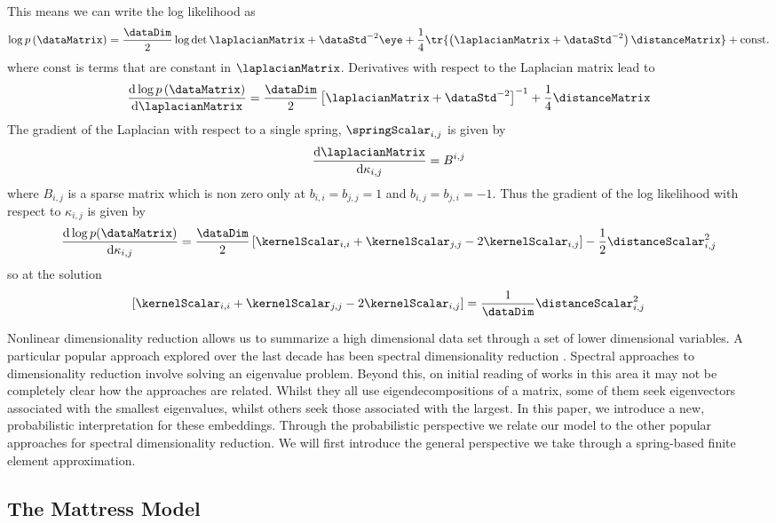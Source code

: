 This means we can write the log likelihood as 
\[
\log p\left(\dataMatrix\right) = \frac{\dataDim}{2}\log \det{\laplacianMatrix + \dataStd^{-2}\eye} + \frac{1}{4}\tr{\left(\laplacianMatrix + \dataStd^{-2}\right)\distanceMatrix} + \mathrm{const}.
\]
where $\mathrm{const}$ is terms that are constant in $\laplacianMatrix$.
Derivatives with respect to the Laplacian matrix lead to 
\[
\frac{\mathrm{d} \log p\left(\dataMatrix\right)}{\mathrm{d}\laplacianMatrix} = \frac{\dataDim}{2} \left[\laplacianMatrix + \dataStd^{-2}\right]^{-1} + \frac{1}{4}\distanceMatrix
\]
The gradient of the Laplacian with respect to a single spring, $\springScalar_{i,j}$ is given by 
\[
\frac{\mathrm{d}\laplacianMatrix}{\mathrm{d}\kappa_{i,j}}= B^{i,j}
\] 
where $B_{i,j}$ is a sparse matrix which is non zero only at $b_{i,i}=b_{j,j}=1$ and $b_{i,j}=b_{j,i}=-1$. Thus the gradient of the log likelihood with respect to $\kappa_{i,j}$ is given by
\[
\frac{\mathrm{d}\log p(\dataMatrix)}{\mathrm{d}\kappa_{i,j}} = \frac{\dataDim}{2}\left[\kernelScalar_{i,i} + \kernelScalar_{j, j} - 2 \kernelScalar_{i, j}\right] - \frac{1}{2}\distanceScalar^2_{i,j}
\]
so at the solution
\[
\left[\kernelScalar_{i,i} + \kernelScalar_{j, j} - 2 \kernelScalar_{i, j}\right] = \frac{1}{\dataDim}\distanceScalar^2_{i,j}
\]

Nonlinear dimensionality reduction allows us to summarize a high
dimensional data set through a set of lower dimensional variables. A
particular popular approach explored over the last decade has been
spectral dimensionality reduction \citep[see e.g.][]{Tenenbaum:isomap00,Roweis:lle00,Belkin:laplacian03,Weinberger:learning04}. Spectral
approaches to dimensionality reduction involve solving an eigenvalue
problem. Beyond this, on initial reading of works in this area it may
not be completely clear how the approaches are related. Whilst they
all use eigendecompositions of a matrix, some of them seek
eigenvectors associated with the smallest eigenvalues, whilst others
seek those associated with the largest. In this paper, we introduce a
new, probabilistic interpretation for these embeddings. Through the
probabilistic perspective we relate our model to the other popular
approaches for spectral dimensionality reduction. We will first
introduce the general perspective we take through a spring-based
finite element approximation.

\subsection{The Mattress Model}

